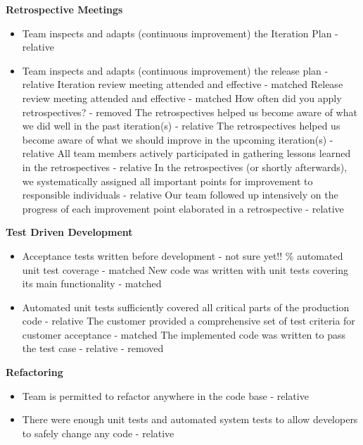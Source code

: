 \begin{appendices}
\textbf{Retrospective Meetings}
\begin{itemize}
	\taa Team inspects and adapts (continuous improvement) the overall process - relative
	\item Team inspects and adapts (continuous improvement) the Iteration Plan - relative
	\item Team inspects and adapts (continuous improvement) the release plan - relative
	\taa Iteration review meeting attended and effective - matched
	\taa Release review meeting attended and effective - matched
	\pam How often did you apply retrospectives? - removed
	\pam The retrospectives helped us become aware of what we did well in the past iteration(s) - relative
	\pam The retrospectives helped us become aware of what we should improve in the upcoming iteration(s) - relative
	\pam All team members actively participated in gathering lessons learned in the retrospectives - relative
	\pamr In the retrospectives (or shortly afterwards), we systematically assigned all important points for improvement to responsible individuals - relative
	\pamr Our team followed up intensively on the progress of each improvement point elaborated in a retrospective - relative
\end{itemize}

\textbf{Test Driven Development}
\begin{itemize}
	\taa Unit tests written before development - matched
	\item Acceptance tests written before development - not sure yet!!
	\% automated unit test coverage - matched
	\pam New code was written with unit tests covering its main functionality - matched
	\item Automated unit tests sufficiently covered all critical parts of the production code - relative
	\pam The customer provided a comprehensive set of test criteria for customer acceptance - matched
	\pam The implemented code was written to pass the test case - relative - removed
\end{itemize}

\textbf{Refactoring}
\begin{itemize}
	\taa Refactoring is continuous - matched
	\item Team is permitted to refactor anywhere in the code base - relative
	\item There were enough unit tests and automated system tests to allow developers to safely change any code - relative
\end{itemize}


\end{appendices}
